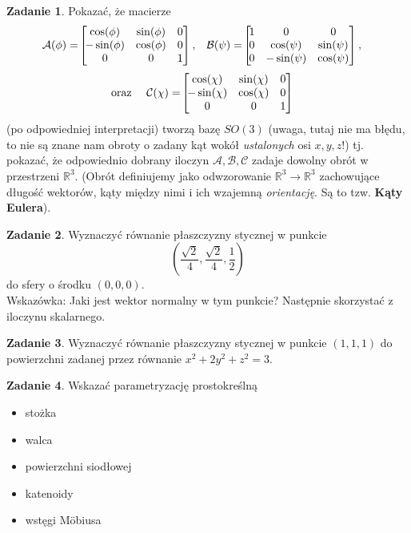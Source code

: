 \documentclass[a4paper,11pt]{article}
\theoremstyle{definition}\newtheorem{exercise}{Zadanie}
\theoremstyle{definition}\newtheorem{remark}{Uwaga}
\begin{document}
\begin{exercise}
Pokazać, że macierze 
\begin{align*}
\mathcal{A}(\phi)&=\!\left[\!\!\!\!
\begin{array}{c c c}
\cos(\phi) &	\sin(\phi)&	0\\
-\sin(\phi) &	\cos(\phi)&	0\\
0 &			0 &	1
\end{array}\!\!\!\right], &
\mathcal{B}(\psi)&=\!\left[\!\!\!\!
\begin{array}{c c c}
1 &	0 		&	0\\
0 &	\cos(\psi) 	&	\sin(\psi)\\
0 &	-\sin(\psi) 	&	\cos(\psi)
\end{array}\!\!\!\right],
\end{align*}
\begin{align*}
\text{oraz }\quad\mathcal{C}(\chi)&=\!\left[\!\!\!\!
\begin{array}{c c c}
\cos(\chi) &	\sin(\chi)&	0\\
-\sin(\chi) &	\cos(\chi)&	0\\
0 &			0 &	1
\end{array}\!\!\!\right]
\end{align*}
(po odpowiedniej interpretacji) tworzą bazę $SO(3)$ (uwaga, tutaj nie ma błędu, 
to nie są znane nam obroty o zadany kąt wokół \textit{ustalonych} osi $x,y,z$!) 
tj. pokazać, że odpowiednio dobrany iloczyn $\mathcal{A},\mathcal{B}, 
\mathcal{C}$ zadaje dowolny obrót w przestrzeni $\mathbb{R}^3$.
(Obrót definiujemy jako odwzorowanie $\mathbb{R}^3\to \mathbb{R}^3$ zachowujące 
długość wektorów, kąty między nimi i ich wzajemną \textit{orientację}. Są to 
tzw. \textbf{Kąty Eulera}).
\end{exercise}


\begin{exercise}
Wyznaczyć równanie płaszczyzny stycznej w punkcie 
\[\left(\frac{\sqrt{2}}{4},\frac{\sqrt{2}}{4},\frac{1}{2}\right)\] do sfery o 
środku $(0,0,0)$.\\[0.1in]
\small{Wskazówka: Jaki jest wektor normalny w tym punkcie? Następnie skorzystać 
z iloczynu skalarnego.}
 \end{exercise}

\begin{exercise}
 Wyznaczyć r\'ownanie płaszczyzny stycznej w punkcie $(1,1,1)$
 do powierzchni zadanej przez r\'ownanie $x^2+2y^2+z^2=3$.
\end{exercise}

\begin{exercise}
 Wskazać parametryzację prostokreślną
 \begin{itemize}
  \item stożka
  \item walca
  \item powierzchni siodłowej
  \item katenoidy
  \item wstęgi M\"obiusa
 \end{itemize}

\end{exercise}
\end{document}
